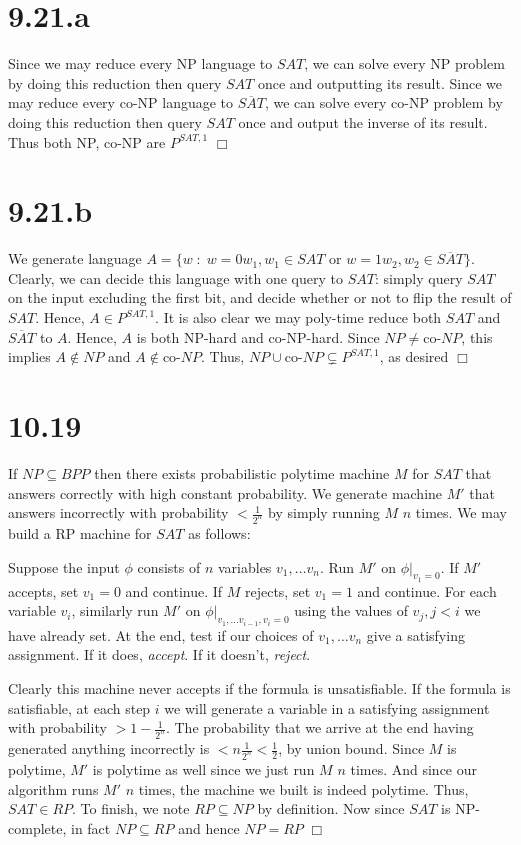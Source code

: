 \documentclass{article}
\newenvironment{myindentpar}[1]
  {\begin{list}{}
          {\setlength{\leftmargin}{#1}
          \setlength{\rightmargin}{#1}}
          \item[]
  }
  {\end{list}}
\begin{document}
\section*{9.21.a}
Since we may reduce every NP language to $SAT$, we can solve every NP problem by doing this reduction then query $SAT$ once and outputting its result. Since we may reduce every co-NP language to $\overline{SAT}$, we can solve every co-NP problem by doing this reduction then query $SAT$ once and output the inverse of its result. Thus both NP, co-NP are $P^{SAT,1}$ $\Box$

\section*{9.21.b}
We generate language $A = \{w\;:\; w = 0w_1, w_1 \in SAT \text{ or } w = 1w_2, w_2 \in \overline{SAT}\}$. Clearly, we can decide this language with one query to $SAT$: simply query $SAT$ on the input excluding the first bit, and decide whether or not to flip the result of $SAT$. Hence, $A \in P^{SAT,1}$. It is also clear we may poly-time reduce both $SAT$ and $\overline{SAT}$ to $A$. Hence, $A$ is both NP-hard and co-NP-hard. Since $NP \neq \text{co-}NP$, this implies $A \notin NP$ and $A \notin \text{co-}NP$. Thus, $NP \cup \text{co-}NP \subsetneq P^{SAT,1}$, as desired $\Box$

\section*{10.19}
If $NP \subseteq BPP$ then there exists probabilistic polytime machine $M$ for $SAT$ that answers correctly with high constant probability. We generate machine $M'$ that answers incorrectly with probability $< \frac{1}{2^n}$ by simply running $M$ $n$ times. We may build a RP machine for $SAT$ as follows:
\begin{myindentpar}{1em}
Suppose the input $\phi$ consists of $n$ variables $v_1, \dots v_n$. Run $M'$ on $\phi\big\vert_{v_1 = 0}$. If $M'$ accepts, set $v_1 = 0$ and continue. If $M$ rejects, set $v_1 = 1$ and continue. For each variable $v_i$, similarly run $M'$ on $\phi\big\vert_{v_1, \dots v_{i-1}, v_i = 0}$ using the values of $v_j, j < i$ we have already set. At the end, test if our choices of $v_1,\dots v_n$ give a satisfying assignment. If it does, \textit{accept}. If it doesn't, \textit{reject}.
\end{myindentpar}
Clearly this machine never accepts if the formula is unsatisfiable. If the formula is satisfiable, at each step $i$ we will generate a variable in a satisfying assignment with probability $> 1 - \frac{1}{2^n}$. The probability that we arrive at the end having generated anything incorrectly is $< n \frac{1}{2^n} < \frac{1}{2}$, by union bound. Since $M$ is polytime, $M'$ is polytime as well since we just run $M$ $n$ times. And since our algorithm runs $M'$ $n$ times, the machine we built is indeed polytime. Thus, $SAT \in RP$. To finish, we note $RP \subseteq NP$ by definition. Now since $SAT$ is NP-complete, in fact $NP \subseteq RP$ and hence $NP = RP$ $\Box$
\end{document}
